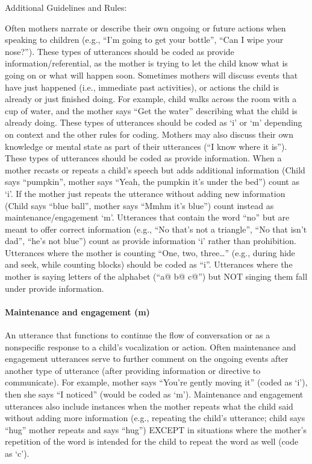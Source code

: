 \documentclass[
]{book}
\begin{document}
Additional Guidelines and Rules:

Often mothers narrate or describe their own ongoing or future actions when speaking to children (e.g., ``I'm going to get your bottle'', ``Can I wipe your nose?''). These types of utterances should be coded as provide information/referential, as the mother is trying to let the child know what is going on or what will happen soon.
Sometimes mothers will discuss events that have just happened (i.e., immediate past activities), or actions the child is already or just finished doing. For example, child walks across the room with a cup of water, and the mother says ``Get the water'' describing what the child is already doing. These types of utterances should be coded as `i' or `m' depending on context and the other rules for coding.
Mothers may also discuss their own knowledge or mental state as part of their utterances (``I know where it is''). These types of utterances should be coded as provide information.
When a mother recasts or repeats a child's speech but adds additional information (Child says ``pumpkin'', mother says ``Yeah, the pumpkin it's under the bed'') count as `i'. If the mother just repeats the utterance without adding new information (Child says ``blue ball'', mother says ``Mmhm it's blue'') count instead as maintenance/engagement `m'.
Utterances that contain the word ``no'' but are meant to offer correct information (e.g., ``No that's not a triangle'', ``No that isn't dad'', ``he's not blue'') count as provide information `i' rather than prohibition.
Utterances where the mother is counting ``One, two, three\ldots{}'' (e.g., during hide and seek, while counting blocks) should be coded as ``i''. Utterances where the mother is saying letters of the alphabet (``a@ b@ c@'') but NOT singing them fall under provide information.

\hypertarget{maintenance_engagement}{%
\paragraph*{Maintenance and engagement (m)}\label{maintenance_engagement}}

An utterance that functions to continue the flow of conversation or as a nonspecific response to a child's vocalization or action. Often maintenance and engagement utterances serve to further comment on the ongoing events after another type of utterance (after providing information or directive to communicate). For example, mother says ``You're gently moving it'' (coded as `i'), then she says ``I noticed'' (would be coded as `m'). Maintenance and engagement utterances also include instances when the mother repeats what the child said without adding more information (e.g., repeating the child's utterance; child says ``hug'' mother repeats and says ``hug'') EXCEPT in situations where the mother's repetition of the word is intended for the child to repeat the word as well (code as `c').
\end{document}
